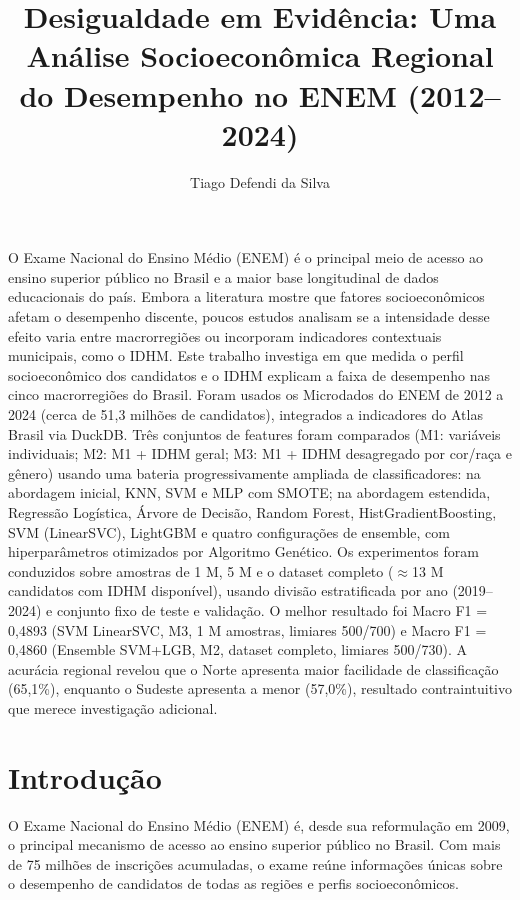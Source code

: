\documentclass[12pt]{article}
\title{Desigualdade em Evidência: Uma Análise Socioeconômica Regional
do Desempenho no ENEM (2012--2024)}
\author{Tiago Defendi da Silva\inst{1}}
\begin{document}
\maketitle

\begin{resumo}
O Exame Nacional do Ensino Médio (ENEM) é o principal meio de acesso ao
ensino superior público no Brasil e a maior base longitudinal de dados
educacionais do país. Embora a literatura mostre que fatores
socioeconômicos afetam o desempenho discente, poucos estudos analisam se
a intensidade desse efeito varia entre macrorregiões ou incorporam
indicadores contextuais municipais, como o IDHM. Este trabalho investiga
em que medida o perfil socioeconômico dos candidatos e o IDHM explicam a
faixa de desempenho nas cinco macrorregiões do Brasil.
Foram usados os Microdados do ENEM de 2012 a 2024 (cerca de 51,3 milhões
de candidatos), integrados a indicadores do Atlas Brasil via DuckDB. Três
conjuntos de features foram comparados (M1: variáveis individuais; M2:
M1 + IDHM geral; M3: M1 + IDHM desagregado por cor/raça e gênero) usando
uma bateria progressivamente ampliada de classificadores: na abordagem
inicial, KNN, SVM e MLP com SMOTE; na abordagem estendida, Regressão
Logística, Árvore de Decisão, Random Forest, HistGradientBoosting, SVM
(LinearSVC), LightGBM e quatro configurações de ensemble, com
hiperparâmetros otimizados por Algoritmo Genético. Os experimentos foram
conduzidos sobre amostras de 1 M, 5 M e o dataset completo ($\approx$13 M
candidatos com IDHM disponível), usando divisão estratificada por ano
(2019--2024) e conjunto fixo de teste e validação. O melhor resultado foi
Macro F1 = 0,4893 (SVM LinearSVC, M3, 1 M amostras, limiares 500/700) e
Macro F1 = 0,4860 (Ensemble SVM+LGB, M2, dataset completo, limiares
500/730). A acurácia regional revelou que o Norte apresenta maior
facilidade de classificação (65,1\%), enquanto o Sudeste apresenta a menor
(57,0\%), resultado contraintuitivo que merece investigação adicional.
\end{resumo}

\section{Introdução}

O Exame Nacional do Ensino Médio (ENEM) é, desde sua reformulação em
2009, o principal mecanismo de acesso ao ensino superior público no
Brasil. Com mais de 75 milhões de inscrições acumuladas, o exame reúne
informações únicas sobre o desempenho de candidatos de todas as regiões
e perfis socioeconômicos.
\end{document}
